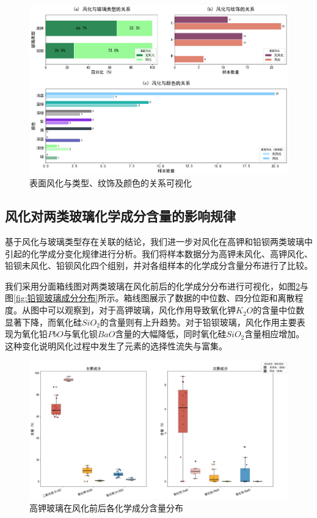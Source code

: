 \begin{figure}[H]

\centering

\includegraphics[width=\textwidth]{figs/3问题一/问题一_关系分析可视化_组合图_黄金分割.png}

\caption{表面风化与类型、纹饰及颜色的关系可视化}

\label{fig:关系分析可视化}

\end{figure}




\subsection{风化对两类玻璃化学成分含量的影响规律}

基于风化与玻璃类型存在关联的结论，我们进一步对风化在高钾和铅钡两类玻璃中引起的化学成分变化规律进行分析。我们将样本数据分为高钾未风化、高钾风化、铅钡未风化、铅钡风化四个组别，并对各组样本的化学成分含量分布进行了比较。

我们采用分面箱线图对两类玻璃在风化前后的化学成分分布进行可视化，如图\ref{fig:高钾玻璃成分分布}与图\ref{fig:铅钡玻璃成分分布}所示。箱线图展示了数据的中位数、四分位距和离散程度。从图中可以观察到，对于高钾玻璃，风化作用导致氧化钾$K_2O$的含量中位数显著下降，而氧化硅$SiO_2$的含量则有上升趋势。对于铅钡玻璃，风化作用主要表现为氧化铅$PbO$与氧化钡$BaO$含量的大幅降低，同时氧化硅$SiO_2$含量相应增加。这种变化说明风化过程中发生了元素的选择性流失与富集。

\begin{figure}[H]
	\centering
	\includegraphics[width=\textwidth]{figs/3问题一/高钾玻璃成分分布.png}
	\caption{高钾玻璃在风化前后各化学成分含量分布}
	\label{fig:高钾玻璃成分分布}
\end{figure}

